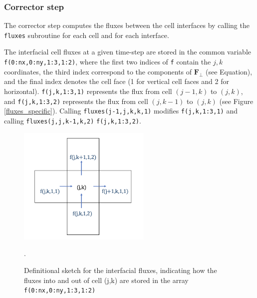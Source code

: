 \documentclass{article}
\newcommand{\code}[1]{\texttt{#1}}
\begin{document}
\subsubsection*{Corrector step}

The corrector step computes the fluxes between the cell interfaces by calling the \code{fluxes} subroutine for each cell and for each interface. 

The interfacial cell fluxes at a given time-step are stored in the common variable \code{f(0:nx,0:ny,1:3,1:2)}, where the first two indices of \code{f} contain the $j,k$ coordinates, the third index correspond to the components of  $\mathbf{F_\perp}$ (see Equation), and the final index denotes the cell face (1 for vertical cell faces and 2 for horizontal).   
\code{f(j,k,1:3,1)} represents the flux from cell $(j-1, k)$ to $(j, k)$, and
\code{f(j,k,1:3,2)} represents the flux from cell $(j, k-1)$ to $(j, k)$ (see Figure \ref{fluxes_specific}).
Calling \code{fluxes(j-1,j,k,k,1)} modifies \code{f(j,k,1:3,1)}  and calling \code{fluxes(j,j,k-1,k,2)} \code{f(j,k,1:3,2)}.

 \begin{figure}[h]
 \centering
\includegraphics[width=15pc]{grid/fluxes_specific.png}
 \caption{Definitional sketch for the interfacial fluxes, indicating how the fluxes into and out of cell (j,k) are stored in the array \code{f(0:nx,0:ny,1:3,1:2)}}.
 \label{fluxes_specific.png}
 \end{figure}
\end{document}
